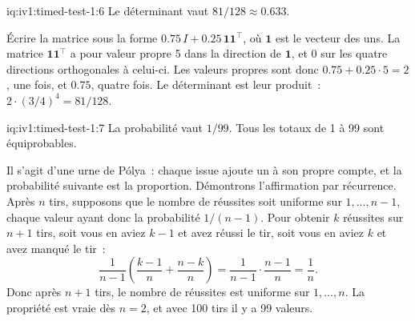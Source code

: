 \begin{solution}{iq:iv1:timed-test-1:6}
Le déterminant vaut $81/128 \approx 0.633$.

Écrire la matrice sous la forme $0.75\,I + 0.25\,\mathbf{1}\mathbf{1}^\top$, où $\mathbf{1}$ est le vecteur des uns. La matrice $\mathbf{1}\mathbf{1}^\top$ a pour valeur propre 5 dans la direction de $\mathbf{1}$, et 0 sur les quatre directions orthogonales à celui-ci. Les valeurs propres sont donc $0.75 + 0.25 \cdot 5 = 2$, une fois, et $0.75$, quatre fois. Le déterminant est leur produit~: $2 \cdot (3/4)^4 = 81/128$.

\end{solution}

\begin{solution}{iq:iv1:timed-test-1:7}
La probabilité vaut $1/99$. Tous les totaux de 1 à 99 sont équiprobables.

Il s'agit d'une urne de Pólya~: chaque issue ajoute un à son propre compte, et la probabilité suivante est la proportion. Démontrons l'affirmation par récurrence. Après $n$ tirs, supposons que le nombre de réussites soit uniforme sur $1, \dots, n - 1$, chaque valeur ayant donc la probabilité $1/(n - 1)$. Pour obtenir $k$ réussites sur $n + 1$ tirs, soit vous en aviez $k - 1$ et avez réussi le tir, soit vous en aviez $k$ et avez manqué le tir~:
\[
\frac{1}{n - 1}\left(\frac{k - 1}{n} + \frac{n - k}{n}\right) = \frac{1}{n - 1}\cdot\frac{n - 1}{n} = \frac1n .
\]
Donc après $n + 1$ tirs, le nombre de réussites est uniforme sur $1, \dots, n$. La propriété est vraie dès $n = 2$, et avec 100 tirs il y a 99 valeurs.

\end{solution}

